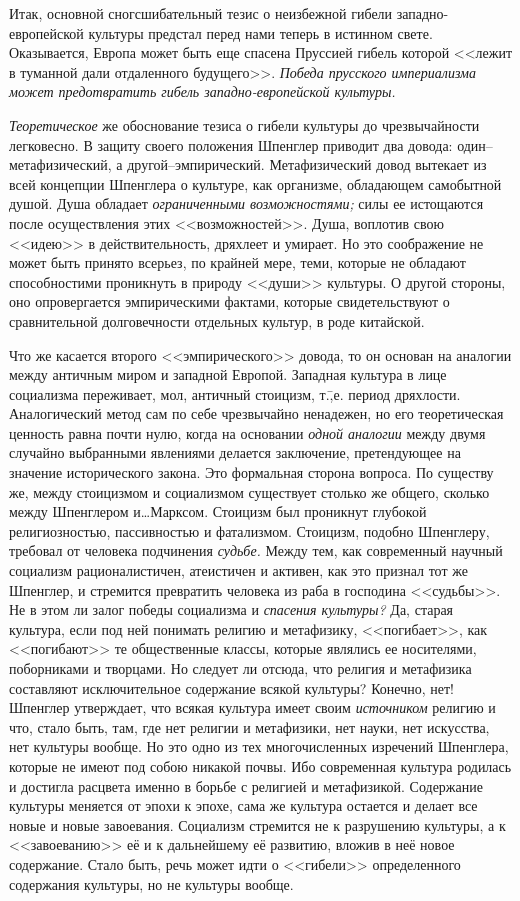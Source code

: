 Итак, основной сногсшибательный тезис о неизбежной гибели западно-европейской культуры предстал перед нами теперь в истинном свете. Оказывается, Европа может быть еще спасена Пруссией гибель которой <<лежит в туманной дали отдаленного будущего>>. \emph{Победа прусского империализма может предотвратить гибель западно-европейской культуры.}

\emph{Теоретическое} же обоснование тезиса о гибели культуры до чрезвычайности легковесно. В защиту своего положения Шпенглер приводит два довода: один\---метафизический, а другой\---эмпирический. Метафизический довод вытекает из всей концепции Шпенглера о культуре, как организме, обладающем самобытной душой. Душа обладает \emph{ограниченными возможностями;} силы ее истощаются после осуществления этих <<возможностей>>. Душа, воплотив свою <<идею>> в действительность, дряхлеет и умирает. Но это соображение не может быть принято всерьез, по крайней мере, теми, которые не обладают способностими проникнуть в природу <<души>> культуры. О другой стороны, оно опровергается эмпирическими фактами, которые свидетельствуют о сравнительной долговечности отдельных культур, в роде китайской.

Что же касается второго <<эмпирического>> довода, то он основан на аналогии между античным миром и западной Европой. Западная культура в лице социализма переживает, мол, античный стоицизм, т.\=,е. период дряхлости. Аналогический метод сам по себе чрезвычайно ненадежен, но его теоретическая ценность равна почти нулю, когда на основании \emph{одной аналогии} между двумя случайно выбранными явлениями делается заключение, претендующее на значение исторического закона. Это формальная сторона вопроса. По существу же, между стоицизмом и социализмом существует столько же общего, сколько между Шпенглером и\dots Марксом. Стоицизм был проникнут глубокой религиозностью, пассивностью и фатализмом. Стоицизм, подобно Шпенглеру, требовал от человека подчинения \emph{судьбе.} Между тем, как современный научный социализм рационалистичен, атеистичен и активен, как это признал тот же Шпенглер, и стремится превратить человека из раба в господина <<судьбы>>. Не в этом ли залог победы социализма и \emph{спасения культуры?} Да, старая культура, если под ней понимать религию и метафизику, <<погибает>>, как <<погибают>> те общественные классы, которые являлись ее носителями, поборниками и творцами. Но следует ли отсюда, что религия и метафизика составляют исключительное содержание всякой культуры? Конечно, нет! Шпенглер утверждает, что всякая культура имеет своим \emph{источником} религию и что, стало быть, там, где нет религии и метафизики, нет науки, нет искусства, нет культуры вообще. Но это одно из тех многочисленных изречений Шпенглера, которые не имеют под собою никакой почвы. Ибо современная культура родилась и достигла расцвета именно в борьбе с религией и метафизикой. Содержание культуры меняется от эпохи к эпохе, сама же культура остается и делает все новые и новые завоевания. Социализм стремится не к разрушению культуры, а к <<завоеванию>> её и к дальнейшему её развитию, вложив в неё новое содержание. Стало быть, речь может идти о <<гибели>> определенного содержания культуры, но не культуры вообще.

